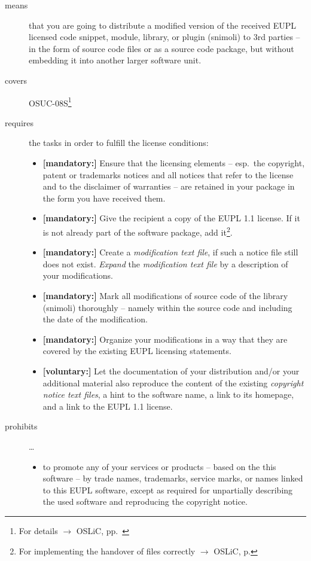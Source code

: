 \begin{description}
\item[means] that you are going to distribute a modified version of the received
EUPL licensed code snippet, module, library, or plugin (snimoli) to 3rd parties
-- in the form of source code files or as a source code package, but without
embedding it into another larger software unit.
\item[covers] OSUC-08S\footnote{For details $\rightarrow$ OSLiC, pp.\
\pageref{OSUC-08S-DEF}}
\item[requires] the tasks in order to fulfill the license conditions:
\begin{itemize}
  
  \item \textbf{[mandatory:]} Ensure that the licensing elements -- esp.\ the
  copyright, patent or trademarks notices and all notices that refer to the
  license and to the disclaimer of warranties -- are retained in your package in
  the form you have received them.
  
  \item \textbf{[mandatory:]} Give the recipient a copy of the EUPL 1.1
  license. If it is not already part of the software package, add
  it\footnote{For implementing the handover of files correctly $\rightarrow$
  OSLiC, p. \pageref{DistributingFilesHint}}.

  \item \textbf{[mandatory:]} Create a \emph{modification text file}, if such a
  notice file still does not exist. \emph{Expand} the \emph{modification text
  file} by a description of your modifications.
  
  \item \textbf{[mandatory:]} Mark all modifications of source code of the
  library (snimoli) thoroughly -- namely within the source code and including
  the date of the modification.
   
  \item \textbf{[mandatory:]} Organize your modifications in a way that they are
  covered by the existing EUPL licensing statements.
  
  \item \textbf{[voluntary:]} Let the documentation of your distribution and/or
  your additional material  also reproduce the content of the existing
  \emph{copyright notice text files}, a hint to the software name, a link to its
  homepage, and a link to the EUPL 1.1 license.

\end{itemize}

\item[prohibits] \ldots
\begin{itemize}
  \item to promote any of your services or products -- based on the this software
  -- by trade names, trademarks, service marks, or names linked to this EUPL
  software, except as required for unpartially describing the used software and
  reproducing the copyright notice.
\end{itemize}

\end{description}


